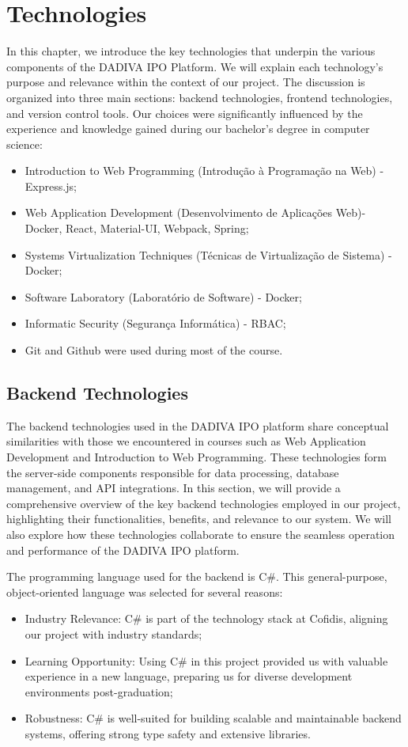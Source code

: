 %
%
\chapter{Technologies} \label{cap:technologies}

 In this chapter, we introduce the key technologies that underpin the various components of the DADIVA IPO Platform. We will explain each technology's purpose and relevance within the context of our project. The discussion is organized into three main sections: backend technologies, frontend technologies, and version control tools. Our choices were significantly influenced by the experience and knowledge gained during our bachelor's degree in computer science:
\begin{itemize}
	\item Introduction to Web Programming (Introdução à Programação na Web) - Express.js;
	\item Web Application Development (Desenvolvimento de Aplicações Web)- Docker, React, Material-UI, Webpack, Spring;
	\item Systems Virtualization Techniques (Técnicas de Virtualização de Sistema) - Docker;
	\item Software Laboratory (Laboratório de Software) - Docker;
	\item Informatic Security (Segurança Informática) - RBAC;
	\item Git and Github were used during most of the course.
\end{itemize}

\section{Backend Technologies}

The backend technologies used in the DADIVA IPO platform share conceptual similarities with those we encountered in courses such as Web Application Development and Introduction to Web Programming. These technologies form the server-side components responsible for data processing, database management, and API integrations. In this section, we will provide a comprehensive overview of the key backend technologies employed in our project, highlighting their functionalities, benefits, and relevance to our system. We will also explore how these technologies collaborate to ensure the seamless operation and performance of the DADIVA IPO platform.

The programming language used for the backend is C\#. This general-purpose, object-oriented language was selected for several reasons:
\begin{itemize}
	\item Industry Relevance: C\# is part of the technology stack at Cofidis, aligning our project with industry standards;
	\item Learning Opportunity: Using C\# in this project provided us with valuable experience in a new language, preparing us for diverse development environments post-graduation;
	\item Robustness: C\# is well-suited for building scalable and maintainable backend systems, offering strong type safety and extensive libraries.
\end{itemize}

